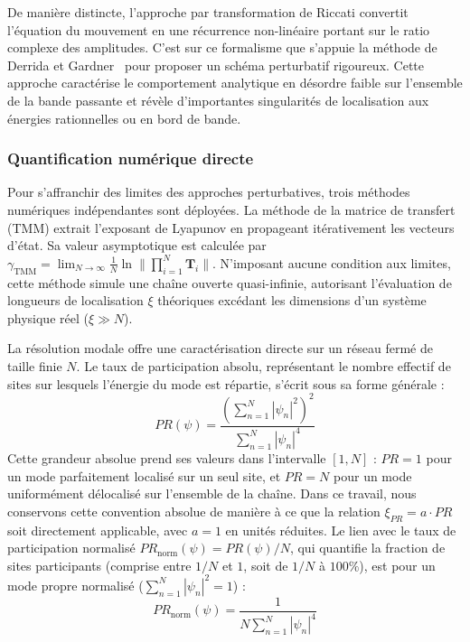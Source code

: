 De manière distincte, l'approche par transformation de Riccati convertit l'équation du mouvement en une récurrence non-linéaire portant sur le ratio complexe des amplitudes. C'est sur ce formalisme que s'appuie la méthode de Derrida et Gardner~\cite{derrida1984lyapounov} pour proposer un schéma perturbatif rigoureux. Cette approche caractérise le comportement analytique en désordre faible sur l'ensemble de la bande passante et révèle d'importantes singularités de localisation aux énergies rationnelles ou en bord de bande.

\subsubsection{Quantification numérique directe}
Pour s'affranchir des limites des approches perturbatives, trois méthodes numériques indépendantes sont déployées. La méthode de la matrice de transfert (TMM) extrait l'exposant de Lyapunov en propageant itérativement les vecteurs d'état. Sa valeur asymptotique est calculée par $\gamma_{\text{TMM}} = \lim_{N \to \infty} \frac{1}{N} \ln \| \prod_{i=1}^N \mathbf{T}_i \|$. N'imposant aucune condition aux limites, cette méthode simule une chaîne ouverte quasi-infinie, autorisant l'évaluation de longueurs de localisation $\xi$ théoriques excédant les dimensions d'un système physique réel ($\xi \gg N$).

La résolution modale offre une caractérisation directe sur un réseau fermé de taille finie $N$. Le taux de participation absolu, représentant le nombre effectif de sites sur lesquels l'énergie du mode est répartie, s'écrit sous sa forme générale :
\begin{equation}
    PR(\psi) = \frac{\left(\sum_{n=1}^N |\psi_n|^2\right)^2}{\sum_{n=1}^N |\psi_n|^4}
    \label{eq:participation_ratio}
\end{equation}
Cette grandeur absolue prend ses valeurs dans l'intervalle $[1, N]$ : $PR = 1$ pour un mode parfaitement localisé sur un seul site, et $PR = N$ pour un mode uniformément délocalisé sur l'ensemble de la chaîne. Dans ce travail, nous conservons cette convention absolue de manière à ce que la relation $\xi_{PR} = a \cdot PR$ soit directement applicable, avec $a = 1$ en unités réduites. Le lien avec le taux de participation normalisé $PR_{\text{norm}}(\psi) = PR(\psi)/N$, qui quantifie la fraction de sites participants (comprise entre $1/N$ et $1$, soit de $1/N$ à $100\%$), est pour un mode propre normalisé ($\sum_{n=1}^N |\psi_n|^2 = 1$) :
\begin{equation*}
    PR_{\text{norm}}(\psi) = \frac{1}{N \sum_{n=1}^N |\psi_n|^4}
\end{equation*}


